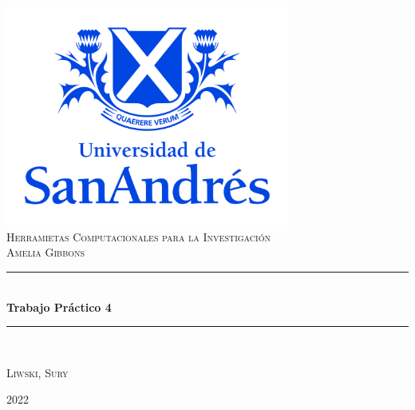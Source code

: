 \documentclass[9pt]{article}
\date{}
\begin{document}
\begin{titlepage} %
	\newcommand{\HRule}{\rule{\linewidth}{0.5mm}} %
	
	\center %
	
	\includegraphics[width=0.7\textwidth]{logoudesa.jpg}\\[0.8cm]
	
	\textsc{\LARGE Herramietas Computacionales para la Investigación}\\[0.5cm] %
	
	\textsc{\Large Amelia Gibbons}\\

	\textcolor{white}{\HRule}\\[0.6cm]
	\huge\bfseries Trabajo Práctico 4
	\textcolor{white}{\HRule}\\[1.5cm]
	\begin{center}
		\Large
		\textsc{Liwski, Sury}\\
	\end{center}
	
	
	\vfill\vfill\vfill %
	{\large 2022}
	\vfill
	
\end{titlepage}
\end{document}
